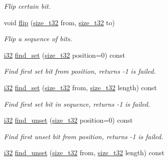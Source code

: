 \begin{DoxyCompactItemize}
\begin{DoxyCompactList}\small\item\em Flip certain bit. \end{DoxyCompactList}\item 
void \hyperlink{classcrap_1_1bit__mask_ad85ebef206759e296aa8edf5aaf3e6dc}{flip} (\hyperlink{types_8h_a38c0a12279ffe0fabec44939e753c914}{size\-\_\-t32} from, \hyperlink{types_8h_a38c0a12279ffe0fabec44939e753c914}{size\-\_\-t32} to)
\begin{DoxyCompactList}\small\item\em Flip a sequence of bits. \end{DoxyCompactList}\item 
\hyperlink{types_8h_a48d6cd8e4135fb2ff7e7f2dac84089ec}{i32} \hyperlink{classcrap_1_1bit__mask_a66b0dc01729f71652595a5eac12a06c7}{find\-\_\-set} (\hyperlink{types_8h_a38c0a12279ffe0fabec44939e753c914}{size\-\_\-t32} position=0) const 
\begin{DoxyCompactList}\small\item\em Find first set bit from position, returns -\/1 is failed. \end{DoxyCompactList}\item 
\hyperlink{types_8h_a48d6cd8e4135fb2ff7e7f2dac84089ec}{i32} \hyperlink{classcrap_1_1bit__mask_ab964501812761624af1a65df632ad0a1}{find\-\_\-set} (\hyperlink{types_8h_a38c0a12279ffe0fabec44939e753c914}{size\-\_\-t32} from, \hyperlink{types_8h_a38c0a12279ffe0fabec44939e753c914}{size\-\_\-t32} length) const 
\begin{DoxyCompactList}\small\item\em Find first set bit in sequence, returns -\/1 is failed. \end{DoxyCompactList}\item 
\hyperlink{types_8h_a48d6cd8e4135fb2ff7e7f2dac84089ec}{i32} \hyperlink{classcrap_1_1bit__mask_a25921fc85e3f0b8a3b7571863793fb12}{find\-\_\-unset} (\hyperlink{types_8h_a38c0a12279ffe0fabec44939e753c914}{size\-\_\-t32} position=0) const 
\begin{DoxyCompactList}\small\item\em Find first unset bit from position, returns -\/1 is failed. \end{DoxyCompactList}\item 
\hyperlink{types_8h_a48d6cd8e4135fb2ff7e7f2dac84089ec}{i32} \hyperlink{classcrap_1_1bit__mask_a819c2779915ff72df0d9e6e40e0351bd}{find\-\_\-unset} (\hyperlink{types_8h_a38c0a12279ffe0fabec44939e753c914}{size\-\_\-t32} from, \hyperlink{types_8h_a38c0a12279ffe0fabec44939e753c914}{size\-\_\-t32} length) const 

\end{DoxyCompactItemize}
